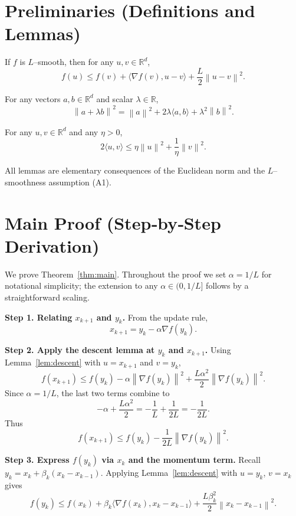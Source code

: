 \documentclass{article}
\newcommand{\norm}[1]{\left\lVert#1\right\rVert}
\newcommand{\grad}{\nabla}
\begin{document}
\section*{Preliminaries (Definitions and Lemmas)}
\begin{lemma}\label{lem:descent}
If $f$ is $L$–smooth, then for any $u,v\in\mathbb{R}^d$,
\[
f(u)\le f(v)+\langle\grad f(v),u-v\rangle+\frac{L}{2}\norm{u-v}^2 .
\]
\end{lemma}
\begin{lemma}\label{lem:quad}
For any vectors $a,b\in\mathbb{R}^d$ and scalar $\lambda\in\mathbb{R}$,
\[
\norm{a+\lambda b}^2 = \norm{a}^2 + 2\lambda\langle a,b\rangle + \lambda^2\norm{b}^2 .
\]
\end{lemma}
\begin{lemma}\label{lem:young}
For any $u,v\in\mathbb{R}^d$ and any $\eta>0$,
\[
2\langle u,v\rangle\le \eta\norm{u}^2+\frac{1}{\eta}\norm{v}^2 .
\]
\end{lemma}
All lemmas are elementary consequences of the Euclidean norm and the
$L$–smoothness assumption (A1).

\section*{Main Proof (Step‑by‑Step Derivation)}
We prove Theorem~\ref{thm:main}.  Throughout the proof we set $\alpha=1/L$
for notational simplicity; the extension to any $\alpha\in(0,1/L]$ follows
by a straightforward scaling.

\noindent\textbf{Step 1.  Relating $x_{k+1}$ and $y_k$.}  
From the update rule,
\[
x_{k+1}=y_k-\alpha\grad f(y_k).
\tag{3}
\]

\noindent\textbf{Step 2.  Apply the descent lemma at $y_k$ and $x_{k+1}$.}  
Using Lemma~\ref{lem:descent} with $u=x_{k+1}$ and $v=y_k$,
\[
f(x_{k+1})\le f(y_k)-\alpha\norm{\grad f(y_k)}^2
               +\frac{L\alpha^{2}}{2}\norm{\grad f(y_k)}^2 .
\tag{4}
\]
Since $\alpha=1/L$, the last two terms combine to
\[
-\alpha+\frac{L\alpha^{2}}{2}= -\frac{1}{L}+\frac{1}{2L}= -\frac{1}{2L}.
\]
Thus
\[
f(x_{k+1})\le f(y_k)-\frac{1}{2L}\norm{\grad f(y_k)}^{2}.
\tag{5}
\]

\noindent\textbf{Step 3.  Express $f(y_k)$ via $x_k$ and the momentum term.}  
Recall $y_k = x_k+\beta_k (x_k-x_{k-1})$.  Applying Lemma~\ref{lem:descent}
with $u=y_k$, $v=x_k$ gives
\[
f(y_k)\le f(x_k)+\beta_k\langle\grad f(x_k),x_k-x_{k-1}\rangle
        +\frac{L\beta_k^{2}}{2}\norm{x_k-x_{k-1}}^{2}.
\tag{6}
\]
\end{document}
